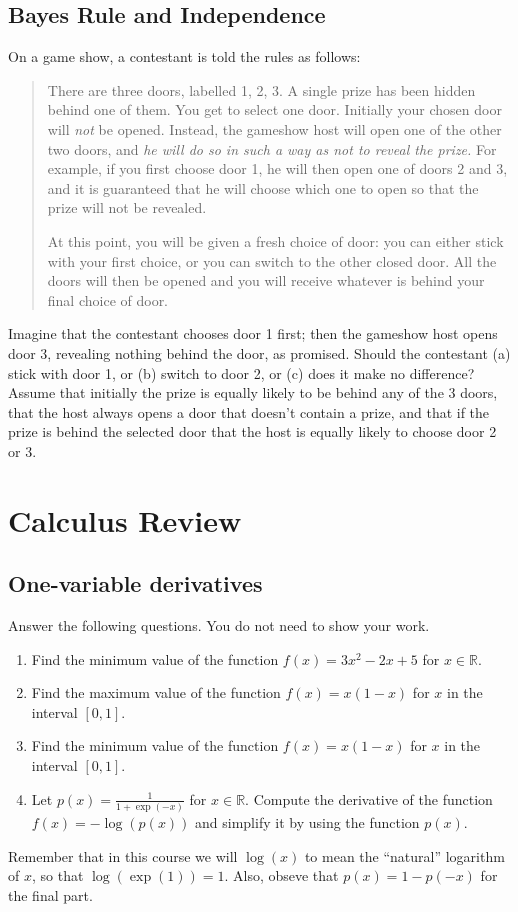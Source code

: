 \documentclass{article}
\def\blu#1{{\color{blu}#1}}
\def\R{\mathbb{R}}
\begin{document}
\subsection{Bayes Rule and Independence}


On a game show, a contestant is told the rules as 
 follows:
\begin{quote}
 There are three doors, labelled 1, 2, 3. A single
 prize has been hidden behind one of 
 them. You get to select one door. Initially your chosen door will {\em not\/} 
 be opened. Instead, the gameshow host will open one of the other two doors, 
 and {\em he will do so in such a way as not to reveal the prize.}
 For example, if you first
 choose door 1, he will then open {one\/} of doors 2 and 3, and it 
 is guaranteed that he will choose which one to open so that
 the prize will not be revealed. 

 At this point, you will be given a fresh choice of door:
 you can either stick with your first choice,
 or you can switch to the other 
 closed door.  All the doors will then be opened and 
 you will  receive whatever is behind your final 
 choice of door.
\end{quote}
  Imagine that the contestant chooses door 1 first; then the gameshow host 
 opens door 3, revealing nothing behind the door, as promised. 
 \blu{Should the contestant (a) stick with door 1, or (b)
 switch to door 2, or (c) does it make no difference?}
Assume that initially the prize is equally likely to be
behind any of the 3 doors, that the host always opens a door that doesn't contain a prize, and that if the prize is behind the selected door that the host is equally likely to choose door 2 or 3.


\section{Calculus Review}

\subsection{One-variable derivatives}

\blu{Answer the following questions.} You do not need to show your work.

\begin{enumerate}
\item Find the minimum value of the function $f(x) = 3x^2 -2x + 5$ for $x \in \R$.
\item Find the maximum value of the function $f(x) = x(1-x)$ for $x$ in the interval $[0,1]$.
\item Find the minimum value of the function $f(x) = x(1-x)$ for $x$ in the interval $[0,1]$.
\item Let $p(x) = \frac{1}{1+\exp(-x)}$ for $x \in \R$. Compute the derivative of the function $f(x) = -\log(p(x))$ and simplify it by using the function $p(x)$.
\end{enumerate}
Remember that in this course we will $\log(x)$ to mean the ``natural'' logarithm of $x$, so that $\log(\exp(1)) = 1$. Also, obseve that $p(x) = 1-p(-x)$ for the final part.
\end{document}
